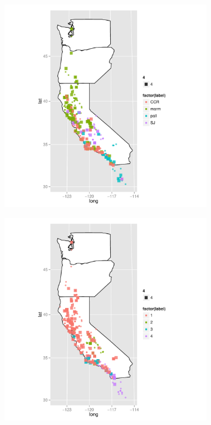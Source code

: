 \documentclass{article}\usepackage{graphicx, color}
\begin{document}
\begin{figure}[t]
  \begin{subfigure}[b]{0.5\textwidth}
    \centering
    \caption{}
    \includegraphics[width = \textwidth]{figure/nnet-map3}
    \label{fig:nnet-map3}
  \end{subfigure}%
  \begin{subfigure}[b]{0.5\textwidth}
    \centering
    \caption{}
    \includegraphics[width = \textwidth]{figure/nnet-map4}

\end{subfigure}
\end{figure}
\end{document}
